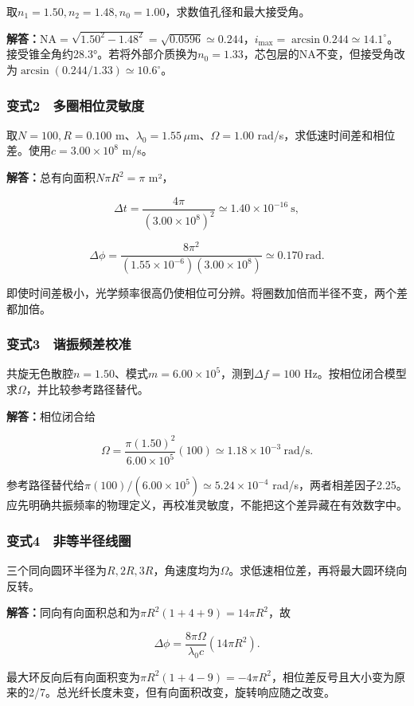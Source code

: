 \documentclass[12pt,a4paper,fontset=fandol]{ctexart}
\begin{document}
取\(n_1=1.50,n_2=1.48,n_0=1.00\)，求数值孔径和最大接受角。

\textbf{解答：}\(\mathrm{NA}=\sqrt{1.50^2-1.48^2}=\sqrt{0.0596}\simeq0.244\)，\(i_{\max}=\arcsin0.244\simeq14.1^\circ\)。接受锥全角约28.3°。若将外部介质换为\(n_0=1.33\)，芯包层的NA不变，但接受角改为\(\arcsin(0.244/1.33)\simeq10.6^\circ\)。

\subsubsection{变式2　多圈相位灵敏度}\label{ux53d8ux5f0f2-ux591aux5708ux76f8ux4f4dux7075ux654fux5ea6}

取\(N=100,R=0.100\) m、\(\lambda_0=1.55\,\mu\mathrm m\)、\(\Omega=1.00\)
rad/s，求低速时间差和相位差。使用\(c=3.00\times10^8\) m/s。

\textbf{解答：}总有向面积\(N\pi R^2=\pi\) m²，

\[
\Delta t=\frac{4\pi}{(3.00\times10^8)^2}
\simeq1.40\times10^{-16}\ \mathrm s,
\]

\[
\Delta\phi=\frac{8\pi^2}
{(1.55\times10^{-6})(3.00\times10^8)}
\simeq0.170\ \mathrm{rad}.
\]

即使时间差极小，光学频率很高仍使相位可分辨。将圈数加倍而半径不变，两个差都加倍。

\par\noindent\begin{minipage}{\linewidth}
\subsubsection{变式3　谐振频差校准}\label{ux53d8ux5f0f3-ux8c10ux632fux9891ux5deeux6821ux51c6}

共旋无色散腔\(n=1.50\)、模式\(m=6.00\times10^5\)，测到\(\Delta f=100\)
Hz。按相位闭合模型求\(\Omega\)，并比较参考路径替代。

\textbf{解答：}相位闭合给

\[
\Omega=\frac{\pi(1.50)^2}{6.00\times10^5}(100)
\simeq1.18\times10^{-3}\ \mathrm{rad/s}.
\]

参考路径替代给\(\pi(100)/(6.00\times10^5)\simeq5.24\times10^{-4}\)
rad/s，两者相差因子2.25。应先明确共振频率的物理定义，再校准灵敏度，不能把这个差异藏在有效数字中。

\subsubsection{变式4　非等半径线圈}\label{ux53d8ux5f0f4-ux975eux7b49ux534aux5f84ux7ebfux5708}

三个同向圆环半径为\(R,2R,3R\)，角速度均为\(\Omega\)。求低速相位差，再将最大圆环绕向反转。

\textbf{解答：}同向有向面积总和为\(\pi R^2(1+4+9)=14\pi R^2\)，故

\[
\Delta\phi=\frac{8\pi\Omega}{\lambda_0c}(14\pi R^2).
\]

最大环反向后有向面积变为\(\pi R^2(1+4-9)=-4\pi R^2\)，相位差反号且大小变为原来的2/7。总光纤长度未变，但有向面积改变，旋转响应随之改变。

\end{minipage}\par
\clearpage
\end{document}
